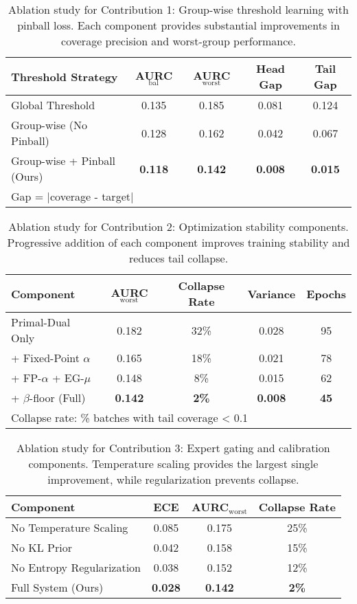 \begin{table}[htbp]
\centering
\caption{Ablation study for Contribution 1: Group-wise threshold learning with pinball loss. Each component provides substantial improvements in coverage precision and worst-group performance.}
\label{tab:c1_ablation}
\begin{tabular}{lcccc}
\toprule
Threshold Strategy & AURC$_{\text{bal}}$ & AURC$_{\text{worst}}$ & Head Gap & Tail Gap \\
\midrule
Global Threshold & 0.135 & 0.185 & 0.081 & 0.124 \\
Group-wise (No Pinball) & 0.128 & 0.162 & 0.042 & 0.067 \\
Group-wise + Pinball (Ours) & \textbf{0.118} & \textbf{0.142} & \textbf{0.008} & \textbf{0.015} \\
\bottomrule
\multicolumn{5}{l}{\footnotesize Gap = $|$coverage - target$|$} \\
\end{tabular}
\end{table}

\begin{table}[htbp]
\centering
\caption{Ablation study for Contribution 2: Optimization stability components. Progressive addition of each component improves training stability and reduces tail collapse.}
\label{tab:c2_ablation}
\begin{tabular}{lcccc}
\toprule
Component & AURC$_{\text{worst}}$ & Collapse Rate & Variance & Epochs \\
\midrule
Primal-Dual Only & 0.182 & 32\% & 0.028 & 95 \\
+ Fixed-Point $\alpha$ & 0.165 & 18\% & 0.021 & 78 \\
+ FP-$\alpha$ + EG-$\mu$ & 0.148 & 8\% & 0.015 & 62 \\
+ $\beta$-floor (Full) & \textbf{0.142} & \textbf{2\%} & \textbf{0.008} & \textbf{45} \\
\bottomrule
\multicolumn{5}{l}{\footnotesize Collapse rate: \% batches with tail coverage < 0.1} \\
\end{tabular}
\end{table}

\begin{table}[htbp]
\centering
\caption{Ablation study for Contribution 3: Expert gating and calibration components. Temperature scaling provides the largest single improvement, while regularization prevents collapse.}
\label{tab:c3_ablation}
\begin{tabular}{lccc}
\toprule
Component & ECE & AURC$_{\text{worst}}$ & Collapse Rate \\
\midrule
No Temperature Scaling & 0.085 & 0.175 & 25\% \\
No KL Prior & 0.042 & 0.158 & 15\% \\
No Entropy Regularization & 0.038 & 0.152 & 12\% \\
Full System (Ours) & \textbf{0.028} & \textbf{0.142} & \textbf{2\%} \\
\bottomrule
\end{tabular}
\end{table}

